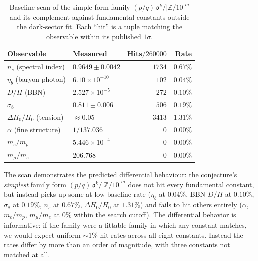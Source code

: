 \documentclass[11pt,reqno]{amsart}
\theoremstyle{plain}
\theoremstyle{definition}
\theoremstyle{remark}
\newcommand{\Z}{\mathbb{Z}}
\begin{document}
\begin{table}[h]
\centering
\caption{Baseline scan of the simple-form family
$(p/q)\,\mathfrak{o}^{k}/|\Z/10|^{m}$ and its complement against
fundamental constants outside the dark-sector fit. Each ``hit''
is a tuple matching the observable within its published $1\sigma$.}
\label{tab:baseline}
\begin{tabular}{llrr}
\toprule
Observable                & Measured           & Hits$/260000$ & Rate \\
\midrule
$n_s$ (spectral index)    & $0.9649 \pm 0.0042$ & $1734$    & $0.67\%$ \\
$\eta_b$ (baryon-photon)  & $6.10 \times 10^{-10}$ & $102$  & $0.04\%$ \\
$D/H$ (BBN)               & $2.527 \times 10^{-5}$ & $272$  & $0.10\%$ \\
$\sigma_8$                & $0.811 \pm 0.006$    & $506$    & $0.19\%$ \\
$\Delta H_0/H_0$ (tension) & $\approx 0.05$       & $3413$  & $1.31\%$ \\
$\alpha$ (fine structure) & $1/137.036$         & $0$       & $0.00\%$ \\
$m_e/m_p$                 & $5.446 \times 10^{-4}$ & $0$    & $0.00\%$ \\
$m_\mu/m_e$               & $206.768$           & $0$       & $0.00\%$ \\
\bottomrule
\end{tabular}
\end{table}

The scan demonstrates the predicted differential behaviour: the
conjecture's \emph{simplest} family form
$(p/q)\,\mathfrak{o}^{k}/|\Z/10|^{m}$ does not hit every
fundamental constant, but instead picks up some at low baseline
rate ($\eta_b$ at $0.04\%$, BBN $D/H$ at $0.10\%$, $\sigma_8$ at
$0.19\%$, $n_s$ at $0.67\%$, $\Delta H_0/H_0$ at $1.31\%$) and
fails to hit others entirely ($\alpha$, $m_e/m_p$, $m_\mu/m_e$
at $0\%$ within the search cutoff). The differential behavior is
informative: if the family were a fittable family in which any
constant matches, we would expect uniform $\sim 1\%$ hit rates
across all eight constants. Instead the rates differ by more
than an order of magnitude, with three constants not matched at
all.
\end{document}
